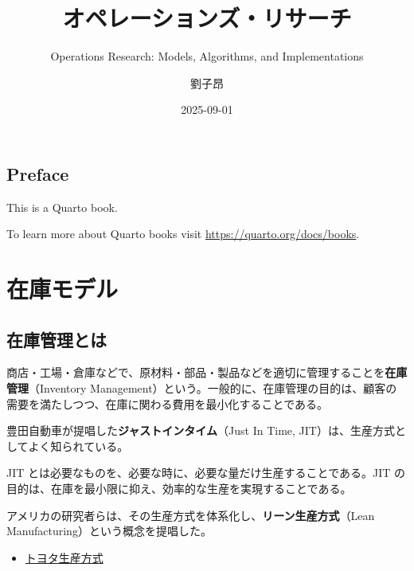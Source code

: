 \documentclass[
  japanese,
  letterpaper,
]{ltjbook}
\title{オペレーションズ・リサーチ}
\subtitle{Operations Research: Models, Algorithms, and Implementations}
\author{劉子昂}
\date{2025-09-01}
\providecommand{\tightlist}{%
  \setlength{\itemsep}{0pt}\setlength{\parskip}{0pt}}
\renewcommand*\contentsname{目次}
\newcommand\contentsname{目次}
\theoremstyle{plain}
\theoremstyle{definition}
\theoremstyle{remark}
\begin{document}
\maketitle

\renewcommand*\contentsname{目次}
{
\hypersetup{linkcolor=}
\setcounter{tocdepth}{2}
\tableofcontents
}


\chapter*{Preface}\label{preface}


This is a Quarto book.

To learn more about Quarto books visit
\url{https://quarto.org/docs/books}.

\part{在庫モデル}

\chapter{在庫管理とは}\label{ux5728ux5eabux7ba1ux7406ux3068ux306f}

商店・工場・倉庫などで、原材料・部品・製品などを適切に管理することを\textbf{在庫管理}（Inventory
Management）という。一般的に、在庫管理の目的は、顧客の需要を満たしつつ、在庫に関わる費用を最小化することである。

\begin{tcolorbox}[enhanced jigsaw, colbacktitle=quarto-callout-note-color!10!white, breakable, opacitybacktitle=0.6, bottomrule=.15mm, title=\textcolor{quarto-callout-note-color}{\faInfo}\hspace{0.5em}{ノート}, leftrule=.75mm, toprule=.15mm, titlerule=0mm, colback=white, colframe=quarto-callout-note-color-frame, bottomtitle=1mm, toptitle=1mm, arc=.35mm, rightrule=.15mm, opacityback=0, left=2mm, coltitle=black]

豊田自動車が提唱した\textbf{ジャストインタイム}（Just In Time,
JIT）は、生産方式としてよく知られている。

JIT とは必要なものを、必要な時に、必要な量だけ生産することである。JIT
の目的は、在庫を最小限に抑え、効率的な生産を実現することである。

アメリカの研究者らは、その生産方式を体系化し、\textbf{リーン生産方式}（Lean
Manufacturing）という概念を提唱した。

\begin{itemize}
\tightlist
\item
  \href{https://global.toyota/jp/company/vision-and-philosophy/production-system/}{トヨタ生産方式}
\end{itemize}

\end{tcolorbox}
\end{document}
